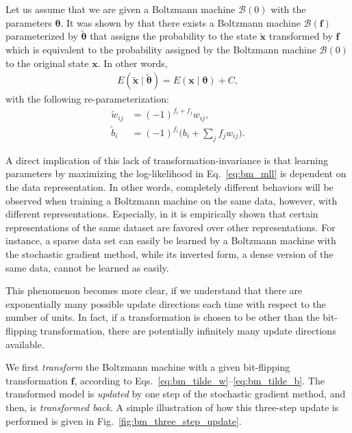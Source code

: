 \documentclass{now}
\newcommand{\vect}[1]{\mathbf{#1}}
\newcommand{\vects}[1]{\boldsymbol{#1}}
\newcommand{\vf}[0]{\vect{f}}
\newcommand{\vx}[0]{\vect{x}}
\newcommand{\TT}[0]{{\vects{\theta}}}
\newcommand{\BB}[0]{\mathcal{B}}
\begin{document}
Let us assume that we are given a Boltzmann machine $\BB(0)$ with the parameters
$\TT$. It was shown by \citet{Cho2013nc} that there exists a Boltzmann machine
$\BB(\vf)$ parameterized by $\tilde{\TT}$ that assigns the probability to the
state $\tilde{\vx}$ transformed by $\vf$ which is equivalent to the probability
assigned by the Boltzmann machine $\BB(0)$ to the original state $\vx$. In other
words,
\begin{align*}
    E(\tilde{\vx} \mid \tilde{\TT})  = E(\vx \mid \TT) + C,
\end{align*}
with the following re-parameterization:
\begin{align}
     \label{eq:bm_tilde_w}
     \tilde{w}_{ij} &= (-1)^{f_i+f_j}w_{ij},
 \\
     \label{eq:bm_tilde_b}
     \tilde{b}_i &= (-1)^{f_i}\biggl(b_i + \sum_j f_j w_{ij}
     \biggr).
\end{align}

A direct implication of this lack of transformation-invariance is that learning
parameters by maximizing the log-likelihood in Eq.~\eqref{eq:bm_mll} is
dependent on the data representation. In other words, completely different
behaviors will be observed when training a Boltzmann machine on the same data,
however, with different representations.  Especially, in \citep{Cho2013nc} it
is empirically shown that certain representations of the same dataset are
favored over other representations. For instance, a sparse data set can easily
be learned by a Boltzmann machine with the stochastic gradient method, while its
inverted form, a dense version of the same data, cannot be learned as easily.

This phenomenon becomes more clear, if we understand that there are
exponentially many possible update directions each time with respect to the
number of units. In fact, if a transformation is chosen to be other than the
bit-flipping transformation, there are potentially infinitely many update
directions available.

We first \textit{transform} the Boltzmann machine with a given bit-flipping
transformation $\vf$, according to
Eqs.~\eqref{eq:bm_tilde_w}--\eqref{eq:bm_tilde_b}. The transformed model is
\textit{updated} by one step of the stochastic gradient method, and then, is
\textit{transformed back}. A simple illustration of how this three-step update
is performed is given in Fig.~\ref{fig:bm_three_step_update}.
\end{document}
